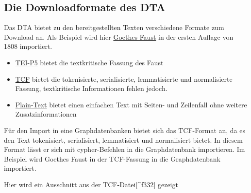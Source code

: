 \documentclass[12pt,ngerman,]{article}
\providecommand{\tightlist}{%
  \setlength{\itemsep}{0pt}\setlength{\parskip}{0pt}}
\begin{document}
\subsection{Die Downloadformate des
DTA}\label{die-downloadformate-des-dta}

Das DTA bietet zu den bereitgestellten Texten verschiedene Formate zum
Download an. Als Beispiel wird hier
\href{http://deutschestextarchiv.de/book/show/goethe_faust01_1808}{Goethes
Faust} in der ersten Auflage von 1808 importiert.

\begin{itemize}
\tightlist
\item
  \href{http://deutschestextarchiv.de/book/download_xml/goethe_faust01_1808}{TEI-P5}
  bietet die textkritische Fassung des Faust
\item
  \href{http://deutschestextarchiv.de/book/download_fulltcf/16181}{TCF}
  bietet die tokenisierte, serialisierte, lemmatisierte und
  normalisierte Fassung, textkritische Informationen fehlen jedoch.
\item
  \href{http://deutschestextarchiv.de/book/download_txt/goethe_faust01_1808}{Plain-Text}
  bietet einen einfachen Text mit Seiten- und Zeilenfall ohne weitere
  Zusatzinformationen
\end{itemize}

Für den Import in eine Graphdatenbanken bietet sich das TCF-Format an,
da es den Text tokenisiert, serialisiert, lemmatisiert und normalisiert
bietet. In diesem Format lässt er sich mit cypher-Befehlen in die
Graphdatenbank importieren. Im Beispiel wird Goethes Faust in der
TCF-Fassung in die Graphdatenbank importiert.

Hier wird ein Ausschnitt aus der TCF-Datei{[}\^{}f332{]} gezeigt
\end{document}
